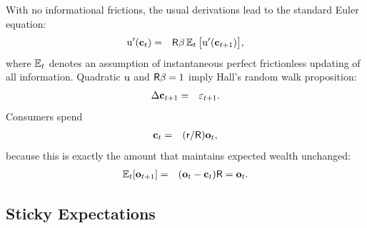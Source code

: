 \documentclass[titlepage]{./econtex}
\begin{document}
With no informational frictions, the usual derivations lead to the standard Euler equation:
\begin{eqnarray*}
  {\mathrm{u}}^{\prime}(\mathbf{c}_{t}) & = & \mathsf{R}\beta \operatorname{\mathbb{E}}_{t}\big[{\mathrm{u}}^{\prime}(\mathbf{c}_{t+1})\big], \label{eq:QuadEuler}
\end{eqnarray*}
 where $\operatorname{\mathbb{E}}_{t}$ denotes an assumption of instantaneous perfect frictionless updating of all information. Quadratic ${\mathrm{u}}$ and $\mathsf{R} \beta=1$ imply Hall's random walk proposition:
\begin{eqnarray*}
  \Delta \mathbf{c}_{t+1} & = & \varepsilon_{t+1} \label{eq:dCQuad}.
\end{eqnarray*}
 Consumers spend
\begin{eqnarray*}
  \mathbf{c}_{t} & = & (\mathsf{r}/\mathsf{R}) \mathbf{o}_{t}, \label{eq:cquad}
\end{eqnarray*}
because this is exactly the amount that maintains expected wealth unchanged:
\begin{eqnarray*}
  \operatorname{\mathbb{E}}_{t}[\mathbf{o}_{t+1}] & = & (\mathbf{o}_{t}-\mathbf{c}_{t})\mathsf{R} = \mathbf{o}_{t}
.
\end{eqnarray*}


\subsection{Sticky Expectations}
\end{document}
